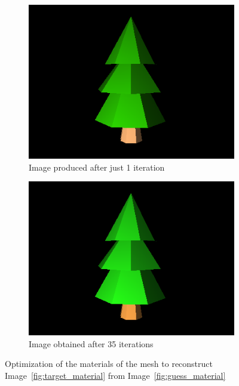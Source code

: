 \documentclass{juliacon}
\begin{document}
\begin{figure}[!htb]
    \begin{subfigure}[c]{0.23\textwidth}
        \centering
        \includegraphics[width=\textwidth]{images/material/1.png}
        \caption{Image produced after just 1 iteration}
        \label{fig:single_step}
    \end{subfigure}
    \hfill
    \begin{subfigure}[c]{0.23\textwidth}
        \centering
        \includegraphics[width=\textwidth]{images/material/33.png}
        \caption{Image obtained after 35 iterations}
    \end{subfigure}
    \caption{Optimization of the materials of the mesh to reconstruct Image~\ref{fig:target_material} from Image~\ref{fig:guess_material}}
    \label{fig:mat_correction}
\end{figure}
\end{document}
